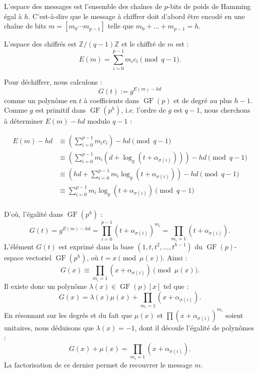 \documentclass[a4paper, titlepage]{article}
\theoremstyle{definition}
\theoremstyle{remark}
\def\Z{\mathbb Z}
\def\gf{\operatorname{GF}}
\begin{document}
L'espace des messages est l'ensemble des chaînes de $p$-bits de poids de Hamming égal à $h$. C'est-à-dire que le message à chiffrer doit d'abord être encodé en une chaîne de bits $m = [m_0\cdots m_{p-1}]$ telle que $m_0+\dots + m_{p-1} = h$.

L'espace des chiffrés est $\Z/(q-1)\Z$ et le chiffré de $m$ est :
$$E(m) = \sum_{i=0}^{p-1} m_ic_i \pmod{q-1}.$$

Pour déchiffrer, nous calculons :
$$G(t) := g^{E(m) - hd}$$
comme un polynôme en $t$ à coefficients dans $\gf(p)$ et de degré au plus $h-1$. Comme $g$ est primitif dans $\gf(p^h)$, i.e. l'ordre de $g$ est $q-1$, nous cherchons à déterminer $E(m) - hd$ modulo $q-1$ :

\begin{align*}
E(m) - hd &\equiv \left(\sum_{i=0}^{p-1} m_ic_i\right) - hd \pmod{q-1} \\
&\equiv \left(\sum_{i=0}^{p-1} m_i\left(d + \log_g\left(t + \alpha_{\sigma(i)}\right)\right)\right) - hd \pmod{q-1} \\
&\equiv \left(hd + \sum_{i=0}^{p-1} m_i\log_g\left(t + \alpha_{\sigma(i)}\right)\right) - hd \pmod{q-1} \\
&\equiv  \sum_{i=0}^{p-1} m_i\log_g\left(t + \alpha_{\sigma(i)}\right) \pmod{q-1} \\
\end{align*}

D'où, l'égalité dans $\gf(p^h)$ : 
$$G(t) = g^{E(m) - hd} = \prod_{i=0}^{p-1} \left(t+\alpha_{\sigma(i)}\right)^{m_i} = \prod_{m_i = 1} \left(t+\alpha_{\sigma(i)}\right).$$
L'élément $G(t)$ est exprimé dans la base $(1,t,t^2, \dots, t^{h-1})$ du $\gf(p)$-espace vectoriel $\gf(p^h)$, où $t = x \pmod{\mu(x)}$. Ainsi :
$$G(x) \equiv \prod_{m_i = 1} \left(x+\alpha_{\sigma(i)}\right) \pmod{\mu(x)}.$$
Il existe donc un polynôme $\lambda(x) \in \gf(p)[x]$ tel que : $$G(x) = \lambda(x) \mu(x) + \prod_{m_i = 1} \left(x+\alpha_{\sigma(i)}\right).$$
En résonnant sur les degrés et du fait que $\mu(x)$ et $\prod \left(x+\alpha_{\sigma(i)}\right)^{m_i}$ soient unitaires, nous déduisons que $\lambda(x) = -1$, dont il découle l'égalité de polynômes :
$$G(x) + \mu(x) = \prod_{m_i = 1} \left(x+\alpha_{\sigma(i)}\right).$$
La factorisation de ce dernier permet de recouvrer le message $m$.
\end{document}
